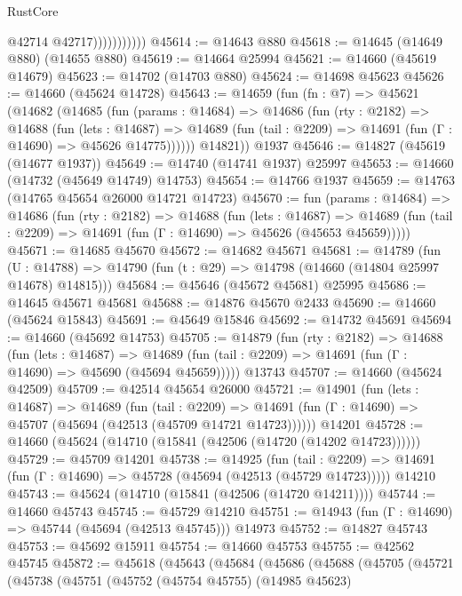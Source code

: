 \begin{lexlean}{RustCore}
\begin{coremodule}
                          @42714
                          @42717)))))))))))
@45614 := @14643 @880
@45618 := @14645 (@14649 @880) (@14655 @880)
@45619 := @14664 @25994
@45621 := @14660 (@45619 @14679)
@45623 := @14702 (@14703 @880)
@45624 := @14698 @45623
@45626 := @14660 (@45624 @14728)
@45643 := @14659
    (fun (fn : @7) =>
    @45621
      (@14682
        (@14685
          (fun (params : @14684) =>
          @14686
            (fun (rty : @2182) =>
            @14688
              (fun (lets : @14687) =>
              @14689 (fun (tail : @2209) => @14691 (fun (Γ : @14690) => @45626 @14775))))))
        @14821))
    @1937
@45646 := @14827 (@45619 (@14677 @1937))
@45649 := @14740 (@14741 @1937) @25997
@45653 := @14660 (@14732 (@45649 @14749) @14753)
@45654 := @14766 @1937
@45659 := @14763 (@14765 @45654 @26000 @14721 @14723)
@45670 := fun (params : @14684) =>
  @14686
    (fun (rty : @2182) =>
    @14688
      (fun (lets : @14687) =>
      @14689 (fun (tail : @2209) => @14691 (fun (Γ : @14690) => @45626 (@45653 @45659)))))
@45671 := @14685 @45670
@45672 := @14682 @45671
@45681 := @14789
    (fun (U : @14788) => @14790 (fun (t : @29) => @14798 (@14660 (@14804 @25997 @14678) @14815)))
@45684 := @45646 (@45672 @45681) @25995
@45686 := @14645 @45671 @45681
@45688 := @14876 @45670 @2433
@45690 := @14660 (@45624 @15843)
@45691 := @45649 @15846
@45692 := @14732 @45691
@45694 := @14660 (@45692 @14753)
@45705 := @14879
    (fun (rty : @2182) =>
    @14688
      (fun (lets : @14687) =>
      @14689 (fun (tail : @2209) => @14691 (fun (Γ : @14690) => @45690 (@45694 @45659)))))
    @13743
@45707 := @14660 (@45624 @42509)
@45709 := @42514 @45654 @26000
@45721 := @14901
    (fun (lets : @14687) =>
    @14689
      (fun (tail : @2209) =>
      @14691 (fun (Γ : @14690) => @45707 (@45694 (@42513 (@45709 @14721 @14723))))))
    @14201
@45728 := @14660 (@45624 (@14710 (@15841 (@42506 (@14720 (@14202 @14723))))))
@45729 := @45709 @14201
@45738 := @14925
    (fun (tail : @2209) => @14691 (fun (Γ : @14690) => @45728 (@45694 (@42513 (@45729 @14723)))))
    @14210
@45743 := @45624 (@14710 (@15841 (@42506 (@14720 @14211))))
@45744 := @14660 @45743
@45745 := @45729 @14210
@45751 := @14943 (fun (Γ : @14690) => @45744 (@45694 (@42513 @45745))) @14973
@45752 := @14827 @45743
@45753 := @45692 @15911
@45754 := @14660 @45753
@45755 := @42562 @45745
@45872 := @45618
    (@45643
      (@45684
        (@45686
          (@45688
            (@45705
              (@45721
                (@45738
                  (@45751
                    (@45752
                      (@45754 @45755)
                      (@14985 @45623)

\end{coremodule}
\end{lexlean}
